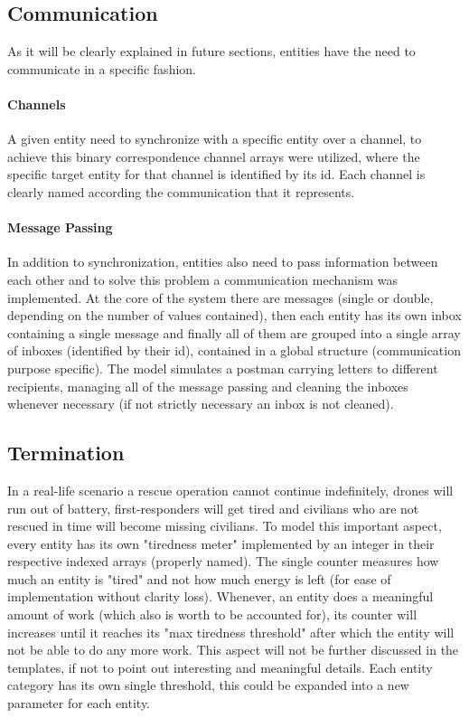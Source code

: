 \subsection{Communication}
As it will be clearly explained in future sections, entities have the need to communicate in a specific fashion.
\paragraph{Channels}
A given entity need to synchronize with a specific entity over a channel, to achieve this binary correspondence channel arrays were utilized, where the specific target entity for that channel is identified by its id. Each channel is clearly named according the communication that it represents.
\paragraph{Message Passing}
In addition to synchronization, entities also need to pass information between each other and to solve this problem a communication mechanism was implemented. At the core of the system there are messages (single or double, depending on the number of values contained), then each entity has its own inbox containing a single message and finally all of them are grouped into a single array of inboxes (identified by their id), contained in a global structure (communication purpose specific). The model simulates a postman carrying letters to different recipients, managing all of the message passing and cleaning the inboxes whenever necessary (if not strictly necessary an inbox is not cleaned).


\subsection{Termination}
In a real-life scenario a rescue operation cannot continue indefinitely, drones will run out of battery, first-responders will get tired and civilians who are not rescued in time will become missing civilians. To model this important aspect, every entity has its own "tiredness meter" implemented by an integer in their respective indexed arrays (properly named). The single counter measures how much an entity is "tired" and not how much energy is left (for ease of implementation without clarity loss). Whenever, an entity does a meaningful amount of work (which also is worth to be accounted for), its counter will increases until it reaches its "max tiredness threshold" after which the entity will not be able to do any more work. This aspect will not be further discussed in the templates, if not to point out interesting and meaningful details. Each entity category has its own single threshold, this could be expanded into a new parameter for each entity.


